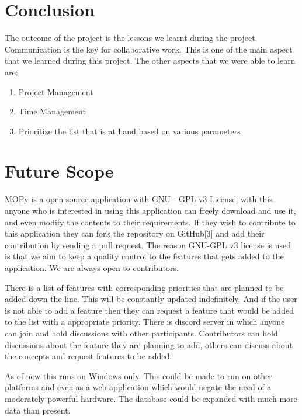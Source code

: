 \documentclass[12pt]{article}
\begin{document}
\section{Conclusion}
The outcome of the project is the lessons we learnt during the project. Communication is the key for collaborative work. This is one of the main aspect that we learned during this project. The other aspects that we were able to learn are:
\begin{enumerate}
\item Project Management
\item Time Management
\item Prioritize the list that is at hand based on various parameters
\end{enumerate}
\section{Future Scope}
\hspace{4em}MOPy is a open source application with GNU - GPL v3 License, with this anyone who is interested in using this application can freely download and use it, and even modify the contents to their requirements. If they wish to contribute to this application they can fork the repository on GitHub[3] and add their contribution by sending a pull request. The reason GNU-GPL v3 license is used is that we aim to keep a quality control to the features that gets added to the application. We are always open to contributors.

There is a list of features with corresponding priorities that are planned to be added down the line. This will be constantly updated indefinitely. And if the user is not able to add a feature then they can request a feature that would be added to the list with a appropriate priority. There is discord server in which anyone can join and hold discussions with other participants. Contributors can hold discussions about the feature they are planning to add, others can discuss about the concepts and request features to be added. 

As of now this runs on Windows only. This could be made to run on other platforms and even as a web application which would negate the need of a moderately powerful hardware. The database could be expanded with much more data than present.
\end{document}
